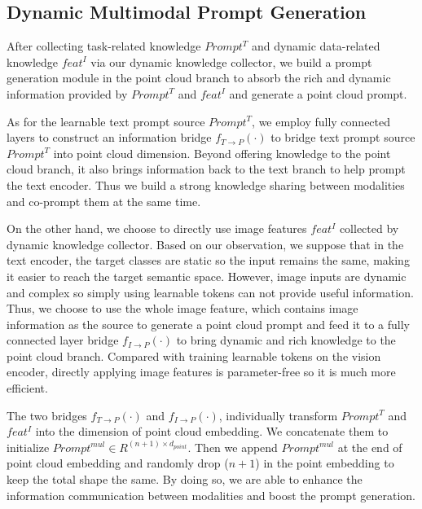 \documentclass{ecai}
\begin{document}
\subsection{Dynamic Multimodal Prompt Generation}
After collecting task-related knowledge $Prompt^T$ and dynamic data-related knowledge $feat^I$ via our dynamic knowledge collector, we build a prompt generation module in the point cloud branch to absorb the rich and dynamic information provided by $Prompt^T$ and $feat^I$ and generate a point cloud prompt.

As for the learnable text prompt source $Prompt^T$, we employ fully connected layers to construct an information bridge $f_{T \rightarrow P}(\cdot)$ to bridge text prompt source $Prompt^T$ into point cloud dimension. Beyond offering knowledge to the point cloud branch, it also brings information back to the text branch to help prompt the text encoder. Thus we build a strong knowledge sharing between modalities and co-prompt them at the same time.

On the other hand, we choose to directly use image features $feat^I$ collected by dynamic knowledge collector. Based on our observation, we suppose that in the text encoder, the target classes are static so the input remains the same, making it easier to reach the target semantic space. However, image inputs are dynamic and complex so simply using learnable tokens can not provide useful information. Thus, we choose to use the whole image feature, which contains image information as the source to generate a point cloud prompt and feed it to a fully connected layer bridge $f_{I \rightarrow P}(\cdot)$ to bring dynamic and rich knowledge to the point cloud branch. Compared with training learnable tokens on the vision encoder, directly applying image features is parameter-free so it is much more efficient. 

The two bridges $f_{T \rightarrow P}(\cdot)$ and $f_{I \rightarrow P}(\cdot)$, individually transform $Prompt^T$ and $feat^I$ into the dimension of point cloud embedding. We concatenate them to initialize  $Prompt^{mul} \in R^{(n+1) \times d_{point}}$. Then we append $Prompt^{mul}$ at the end of point cloud embedding and randomly drop ($n+1$) in the point embedding to keep the total shape the same. By doing so, we are able to enhance the information communication between modalities and boost the prompt generation.
\end{document}

